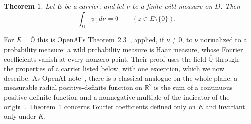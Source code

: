\documentclass[10pt]{article}
\newtheorem{thm}{Theorem}[section]
\theoremstyle{remark}
\newcommand{\R}{\mathbb R}
\newcommand{\Qbar}{\overline{\mathbb Q}}
\begin{document}
\begin{thm}\label{thm:rigidity}
Let $E$ be a carrier, and let $\nu$ be a finite wild measure on $D$. Then
\[
 \int_D\psi_z\,d\nu=0\qquad(z\in E\setminus\{0\}).
\]
\end{thm}

For $E=\Qbar$ this is OpenAI's Theorem~2.3~\cite{OAI}, applied, if $\nu\ne0$, to $\nu$ normalized to a probability measure: a wild probability measure is Haar measure, whose Fourier coefficients vanish at every nonzero point. Their proof uses the field $\Qbar$ through the properties of a carrier listed below, with one exception, which we now describe. As OpenAI note~\cite[Section~2]{OAI}, there is a classical analogue on the whole plane: a measurable radial positive-definite function on $\R^2$ is the sum of a continuous positive-definite function and a nonnegative multiple of the indicator of the origin~\cite{Crum,GneitingSasvari}. Theorem~\ref{thm:rigidity} concerns Fourier coefficients defined only on $E$ and invariant only under $K$.
\end{document}
